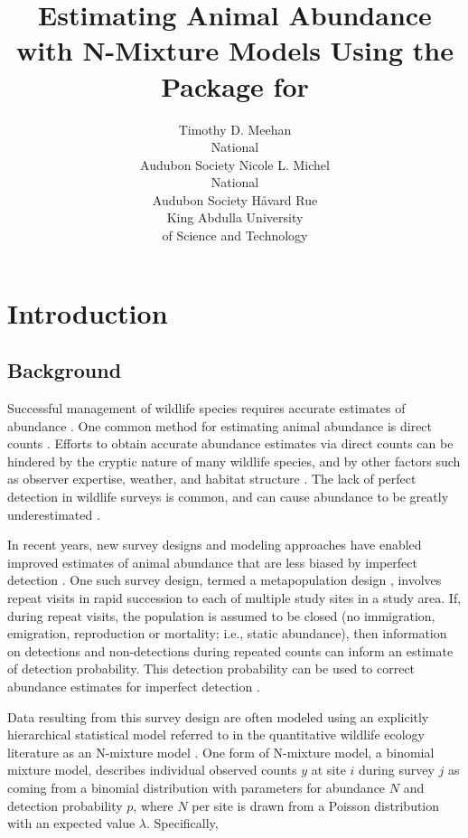 \documentclass[codesnippet]{jss}
\author{Timothy D. Meehan\\National\\Audubon Society \And
	Nicole L. Michel\\National\\Audubon Society \And
	H{\aa}vard Rue\\King Abdulla University\\of Science and Technology}
\title{Estimating Animal Abundance with N-Mixture Models Using the 
\pkg{R-INLA} Package for \proglang{R}}
\begin{document}
	
\section[Introduction]{Introduction}
\subsection[Background]{Background}
Successful management of wildlife species requires accurate estimates of 
abundance  
\citep{Yoccoz_Nichols_Boulinier_2001}. One common method for estimating 
animal abundance is direct counts 
\citep{Pollock_Nichols_Simons_Farnsworth_Bailey_Sauer_2002}. Efforts to 
obtain accurate abundance estimates via direct counts can be hindered by the 
cryptic nature of many wildlife species, and by other factors such as 
observer expertise, weather, and habitat structure 
\citep{Denes_Silveira_Beissinger_2015}. The lack of perfect detection in 
wildlife surveys is common, and can cause abundance to be greatly 
underestimated  
\citep{Wenger_Freeman_2008, Joseph_Elkin_Martin_Possingham_2009}.

In recent years, new survey designs and modeling approaches have enabled improved estimates of animal abundance that are less biased by imperfect detection \citep{Denes_Silveira_Beissinger_2015}. One such survey design, termed a metapopulation design \citep{Kery_Royle_2010}, involves repeat visits in rapid succession to each of multiple study sites in a study area. If, during repeat visits, the population is assumed to be closed (no immigration, emigration, reproduction or mortality; i.e., static abundance), then information on detections and non-detections during repeated counts can inform an estimate of detection probability. This detection probability can be used to correct abundance estimates for imperfect detection \citep{Royle_2004}.

Data resulting from this survey design are often modeled using an explicitly 
hierarchical statistical model referred to in the quantitative wildlife 
ecology literature as an N-mixture model  
\citep{Royle_Nichols_2003, Dodd_Dorazio_2004, Royle_2004, 
Kery_Royle_Schmid_2005}. One form of N-mixture model, a binomial mixture 
model, describes individual observed counts $y$ at site $i$ during survey 
$j$ as coming from a binomial distribution with parameters for abundance $N$ 
and detection probability $p$, where $N$ per site is drawn from a Poisson 
distribution with an expected value $\lambda$. Specifically,
\end{document}
